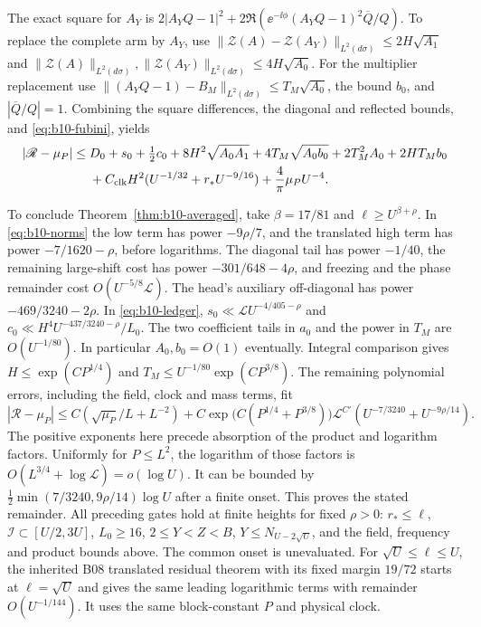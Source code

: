 The exact square for \(A_Y\) is
\(2|A_YQ-1|^2+2\Re(\ee^{-\ii\phi}(A_YQ-1)^2\overline Q/Q)\).
To replace the complete arm by \(A_Y\), use
\(\|\mathcal Z(A)-\mathcal Z(A_Y)\|_{L^2(d\sigma)}
 \le2H\sqrt{A_1}\) and
\(\|\mathcal Z(A)\|_{L^2(d\sigma)},\|\mathcal Z(A_Y)\|_{L^2(d\sigma)}
 \le4H\sqrt{A_0}\). For the multiplier replacement use
\(\|(A_YQ-1)-B_M\|_{L^2(d\sigma)}\le T_M\sqrt{A_0}\),
the bound \(b_0\), and \(|\overline Q/Q|=1\).
Combining the square differences, the diagonal and reflected
bounds, and \eqref{eq:b10-fubini}, yields
\begin{align}
 |\mathscr R-\mu_P|\le{}&
 D_0+s_0+\tfrac12c_0+8H^2\sqrt{A_0A_1}
    +4T_M\sqrt{A_0b_0}+2T_M^2A_0+2HT_M b_0\nonumber\\
 &+C_{\rm clk}H^2(U^{-1/32}+r_*U^{-9/16})
    +\frac4\pi\mu_P U^{-4}.
 \label{eq:b10-ledger}
\end{align}

To conclude Theorem~\ref{thm:b10-averaged}, take
\(\beta=17/81\) and \(\ell\ge U^{\beta+\rho}\).
In \eqref{eq:b10-norms} the low term has power \(-9\rho/7\),
and the translated high term has power \(-7/1620-\rho\),
before logarithms. The diagonal tail has power \(-1/40\),
the remaining large-shift cost has power \(-301/648-4\rho\),
and freezing and the phase remainder cost \(O(U^{-5/8}\mathcal L)\).
The head's auxiliary off-diagonal has power \(-469/3240-2\rho\).
In \eqref{eq:b10-ledger}, \(s_0\ll\mathcal L U^{-4/405-\rho}\)
and \(c_0\ll H^4U^{-437/3240-\rho}/L_0\).
The two coefficient tails in \(a_0\) and the power in \(T_M\)
are \(O(U^{-1/80})\). In particular \(A_0,b_0=O(1)\) eventually.
Integral comparison gives \(H\le\exp(CP^{1/4})\) and
\(T_M\le U^{-1/80}\exp(CP^{3/8})\).
The remaining polynomial errors, including the field, clock and
mass terms, fit
\[
 |\mathscr R-\mu_P|
 \le C(\sqrt{\mu_P}/L+L^{-2})
 +C\exp\bigl(C(P^{1/4}+P^{3/8})\bigr)\mathcal L^{C'}
       (U^{-7/3240}+U^{-9\rho/14}).
\]
The positive exponents here precede absorption of the product and
logarithm factors. Uniformly for \(P\le L^2\), the logarithm of
those factors is \(O(L^{3/4}+\log\mathcal L)=o(\log U)\). It
can be bounded by \(\tfrac12\min(7/3240,9\rho/14)\log U\)
after a finite onset. This proves the stated remainder. All
preceding gates hold at finite heights for fixed \(\rho>0\):
\(r_*\le\ell\), \(\mathcal I\subset[U/2,3U]\), \(L_0\ge16\),
\(2\le Y<Z<B\), \(Y\le N_{U-2\sqrt U}\), and the field,
frequency and product bounds above. The common onset is
unevaluated. For \(\sqrt U\le\ell\le U\), the inherited B08
translated residual theorem \cite[Eq.~(B08.1)]{GNPRSGrowingExponentPair}
with its fixed margin \(19/72\) starts at \(\ell=\sqrt U\)
and gives the same leading logarithmic terms with remainder
\(O(U^{-1/144})\). It uses the same block-constant \(P\) and
physical clock.

